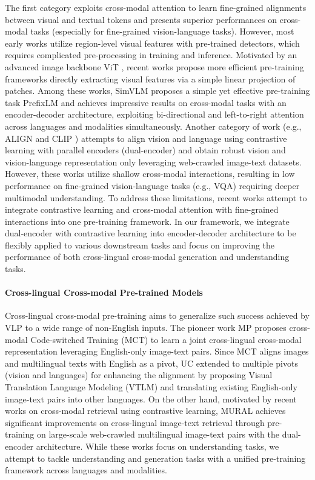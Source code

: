 \documentclass{article}
\begin{document}
The first category exploits cross-modal attention to learn fine-grained alignments between visual and textual tokens and presents superior performances on cross-modal tasks (especially for fine-grained vision-language tasks). However, most early works utilize region-level visual features with pre-trained detectors, which requires complicated pre-processing in training and inference. Motivated by an advanced image backbone ViT \cite{vit2020}, recent works \cite{Kim2021ViLTVT,simvlm2021,dou2022an} propose more efficient pre-training frameworks directly extracting visual features via a simple linear projection of patches. Among these works, SimVLM \cite{simvlm2021} proposes a simple yet effective pre-training task PrefixLM and achieves impressive results on cross-modal tasks with an encoder-decoder architecture, exploiting bi-directional and left-to-right attention across languages and modalities simultaneously. Another category of work (e.g., ALIGN \cite{Jia2021ScalingUV} and CLIP \cite{Radford2021LearningTV}) attempts to align vision and language using contrastive learning with parallel encoders (dual-encoder) and obtain robust vision and vision-language representation only leveraging web-crawled image-text datasets. However, these works utilize shallow cross-modal interactions, resulting in low performance on fine-grained vision-language tasks (e.g., VQA) requiring deeper multimodal understanding. To address these limitations, recent works \cite{Yuan2021FlorenceAN,Singh2021FLAVAAF,albef2021} attempt to integrate contrastive learning and cross-modal attention with fine-grained interactions into one pre-training framework. In our framework, we integrate dual-encoder with contrastive learning into encoder-decoder architecture to be flexibly applied to various downstream tasks and focus on improving the performance of both cross-lingual cross-modal generation and understanding tasks.

\paragraph{Cross-lingual Cross-modal Pre-trained Models}
Cross-lingual cross-modal pre-training aims to generalize such success achieved by VLP to a wide range of non-English inputs. The pioneer work MP \cite{m3p2020} proposes cross-modal Code-switched Training (MCT) to learn a joint cross-lingual cross-modal representation leveraging English-only image-text pairs. Since MCT aligns images and multilingual texts with English as a pivot, UC \cite{UC22021} extended to multiple pivots (vision and languages) for enhancing the alignment by proposing Visual Translation Language Modeling (VTLM) and translating existing English-only image-text pairs into other languages. On the other hand, motivated by recent works on cross-modal retrieval using contrastive learning, MURAL \cite{mural2021} achieves significant improvements on cross-lingual image-text retrieval through pre-training on large-scale web-crawled multilingual image-text pairs with the dual-encoder architecture. While these works focus on understanding tasks, we attempt to tackle understanding and generation tasks with a unified pre-training framework across languages and modalities. 
\end{document}
